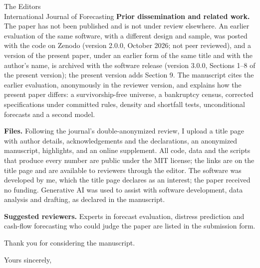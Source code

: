 \documentclass[11pt]{letter}
\begin{document}
\begin{letter}{The Editors\\International Journal of Forecasting}
\textbf{Prior dissemination and related work.} The paper has not been published and is not under review elsewhere. An earlier evaluation of the same software, with a different design and sample, was posted with the code on Zenodo (version 2.0.0, October 2026; not peer reviewed), and a version of the present paper, under an earlier form of the same title and with the author's name, is archived with the software release (version 3.0.0, Sections 1--8 of the present version); the present version adds Section 9. The manuscript cites the earlier evaluation, anonymously in the reviewer version, and explains how the present paper differs: a survivorship-free universe, a bankruptcy census, corrected specifications under committed rules, density and shortfall tests, unconditional forecasts and a second model.

\textbf{Files.} Following the journal's double-anonymized review, I upload a title page with author details, acknowledgements and the declarations, an anonymized manuscript, highlights, and an online supplement. All code, data and the scripts that produce every number are public under the MIT license; the links are on the title page and are available to reviewers through the editor. The software was developed by me, which the title page declares as an interest; the paper received no funding. Generative AI was used to assist with software development, data analysis and drafting, as declared in the manuscript.

\textbf{Suggested reviewers.} Experts in forecast evaluation, distress prediction and cash-flow forecasting who could judge the paper are listed in the submission form.

Thank you for considering the manuscript.

\closing{Yours sincerely,}
\end{letter}
\end{document}
